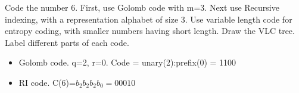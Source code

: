 \begin{question}
Code the number 6. First, use Golomb code with m=3.
Next use Recursive indexing, with a
representation alphabet of size 3. Use variable
length code for entropy coding, with smaller
numbers having short length. Draw the VLC tree.
Label different parts of each code.

\end{question}
\begin{solution}
\begin{itemize}
\item Golomb code. q=2, r=0. Code = unary(2):prefix(0) = 1100
\item RI code. C(6)=$b_2b_2b_2b_0=00010$

\end{itemize}
\end{solution}


